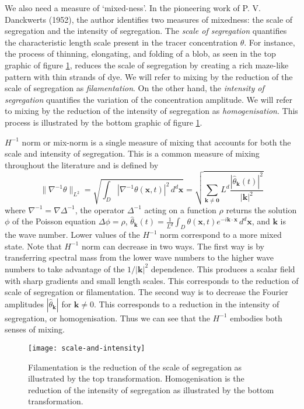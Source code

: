 \documentclass[12pt]{iopart}
\newcommand{\hmone}[1]{\|\nabla^{-1} #1\|_{L^{2}}}
\newcommand{\sint}[1]{\int_{D} #1 \, d^{d}\mathbf{x}}
\renewcommand{\vec}[1]{\mathbf{#1}}
\begin{document}
We also need a measure of `mixed-ness'. In the pioneering work of P. V. Danckwerts (1952)\cite{Danckwerts1952}, the author identifies two measures of mixedness: the scale of segregation and the intensity of segregation. The {\it scale of segregation } quantifies the characteristic length scale present in the tracer concentration $\theta$. For instance, the process of thinning, elongating, and folding of a blob, as seen in the top graphic of figure \ref{fig:scale-and-intensity}, reduces the scale of segregation by creating a rich maze-like pattern with thin strands of dye. We will refer to mixing by the reduction of the scale of segregation as {\it filamentation}.  On the other hand, the {\it intensity of segregation } quantifies the variation of the concentration amplitude. We will refer to mixing by the reduction of the intensity of segregation as {\it homogenisation}. This process is illustrated by the bottom graphic of figure \ref{fig:scale-and-intensity}.

 $H^{-1}$ norm or mix-norm \cite{GM2005} is a single measure of mixing that accounts for both the scale and intensity of segregation. This is a common measure of mixing throughout the literature and is defined by  
%
\begin{equation}
\hmone{\theta}=\sqrt{\sint{ |\nabla^{-1} \theta( \vec{x},t)|^2}}=\sqrt{ \sum_{\vec{k}\neq \vec{0}} L^d \frac{|\hat{\theta}_{\vec{k}}(t)|^{2}}{|\vec{k}|^2}}
\end{equation}
%
where $\nabla^{-1}=\nabla \Delta^{-1}$, the operator $\Delta^{-1}$ acting on  a function $\rho$ returns the solution $\phi$ of the Poisson equation $ \Delta \phi = \rho $, $\hat{\theta}_{\vec{k}}(t) =  \frac{1}{L^{d}}\sint{\theta(\vec{x},t)e^{-i\vec{k}\cdot\vec{x}}}$, and $\vec{k}$ is the wave number.  Lower values of the  $H^{-1}$ norm correspond to a more mixed state. Note that $H^{-1}$ norm can decrease in two ways.  The first way is by transferring spectral mass from the lower wave numbers to the higher wave numbers to take advantage of the $1/|\vec{k}|^2$ dependence. This produces a scalar field with sharp gradients and small length scales. This corresponds to the reduction of scale of segregation or filamentation. The second way is to decrease the Fourier amplitudes $|\hat{\theta}_{\vec{k}}|$ for $\vec{k}\neq 0$. This corresponds to a reduction in the intensity of segregation, or homogenisation. Thus we can see that the $H^{-1}$ embodies both senses of mixing. 

\begin{figure}
	\centering
	\texttt{[image: scale-and-intensity]}
	\caption{Filamentation is the reduction of the scale of segregation as illustrated by the top transformation. Homogenisation is the reduction of the intensity of segregation as illustrated by the bottom transformation.}
	\label{fig:scale-and-intensity}
\end{figure}
\end{document}
